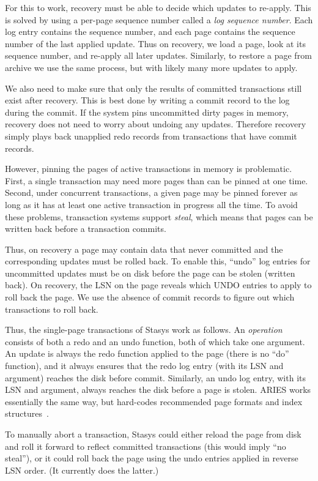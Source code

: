 \documentclass[letterpaper,twocolumn,10pt]{article}
\newcommand{\yad}{Stasys\xspace}
\begin{document}
For this to work, recovery must be able to decide which updates to
re-apply.  This is solved by using a per-page sequence number called a
{\em log sequence number}. Each log entry contains the sequence
number, and each page contains the sequence number of the last applied
update.  Thus on recovery, we load a page, look at its sequence
number, and re-apply all later updates.  Similarly, to restore a page
from archive we use the same process, but with likely many more
updates to apply.

We also need to make sure that only the results of committed
transactions still exist after recovery.  This is best done by writing
a commit record to the log during the commit.  If the system pins uncommitted
dirty pages in memory, recovery does not need to worry about undoing 
any updates.  Therefore recovery simply plays back unapplied redo records from 
transactions that have commit records.

However, pinning the pages of active transactions in memory is problematic.
First, a single transaction may need more pages than can be pinned at
one time. Second, under concurrent transactions, a given page may be
pinned forever as long as it has at least one active transaction in
progress all the time.  To avoid these problems, transaction systems
support {\em steal}, which means that pages can be written back
before a transaction commits. 

Thus, on recovery a page may contain data that never committed and the
corresponding updates must be rolled back.  To enable this, ``undo'' log
entries for uncommitted updates must be on disk before the page can be
stolen (written back).  On recovery, the LSN on the page reveals which
UNDO entries to apply to roll back the page. We use the absence of
commit records to figure out which transactions to roll back.

Thus, the single-page transactions of \yad work as follows.  An {\em
operation} consists of both a redo and an undo function, both of which
take one argument. An update is always the redo function applied to
the page (there is no ``do'' function), and it always ensures that the
redo log entry (with its LSN and argument) reaches the disk before
commit.  Similarly, an undo log entry, with its LSN and argument,
always reaches the disk before a page is stolen.  ARIES works
essentially the same way, but hard-codes recommended page 
formats and index structures~\cite{ariesIM}.

To manually abort a transaction, \yad could either reload the page
from disk and roll it forward to reflect committed transactions (this would imply ``no steal''), or it
could roll back the page using the undo entries applied in reverse LSN
order. (It currently does the latter.)
\end{document}
